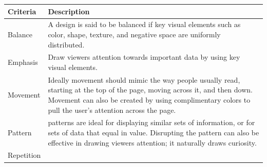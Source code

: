 \documentclass[]{book}
\theoremstyle{definition}
\theoremstyle{definition}
\theoremstyle{definition}
\theoremstyle{remark}
\begin{document}
\begin{longtable}[]{@{}ll@{}}
\toprule
\begin{minipage}[b]{0.16\columnwidth}\raggedright\strut
\textbf{Criteria}\strut
\end{minipage} & \begin{minipage}[b]{0.78\columnwidth}\raggedright\strut
\textbf{Description}\strut
\end{minipage}\tabularnewline
\midrule
\endhead
\begin{minipage}[t]{0.16\columnwidth}\raggedright\strut
Balance\strut
\end{minipage} & \begin{minipage}[t]{0.78\columnwidth}\raggedright\strut
A design is said to be balanced if key visual elements such as color,
shape, texture, and negative space are uniformly distributed.\strut
\end{minipage}\tabularnewline
\begin{minipage}[t]{0.16\columnwidth}\raggedright\strut
Emphasis\strut
\end{minipage} & \begin{minipage}[t]{0.78\columnwidth}\raggedright\strut
Draw viewers attention towards important data by using key visual
elements.\strut
\end{minipage}\tabularnewline
\begin{minipage}[t]{0.16\columnwidth}\raggedright\strut
Movement\strut
\end{minipage} & \begin{minipage}[t]{0.78\columnwidth}\raggedright\strut
Ideally movement should mimic the way people usually read, starting at
the top of the page, moving across it, and then down. Movement can also
be created by using complimentary colors to pull the user's attention
across the page.\strut
\end{minipage}\tabularnewline
\begin{minipage}[t]{0.16\columnwidth}\raggedright\strut
Pattern\strut
\end{minipage} & \begin{minipage}[t]{0.78\columnwidth}\raggedright\strut
patterns are ideal for displaying similar sets of information, or for
sets of data that equal in value. Disrupting the pattern can also be
effective in drawing viewers attention; it naturally draws
curiosity.\strut
\end{minipage}\tabularnewline
\begin{minipage}[t]{0.16\columnwidth}\raggedright\strut
Repetition\strut
\end{minipage} & \begin{minipage}[t]{0.78\columnwidth}\raggedright\strut

\end{minipage}
\end{longtable}
\end{document}
